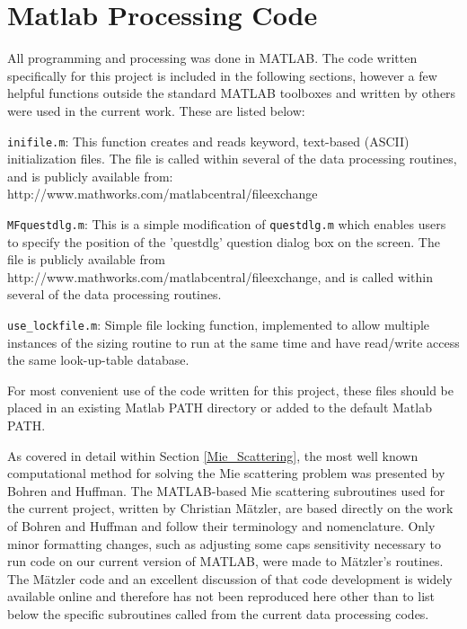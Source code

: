 \chapter{Matlab Processing Code}
\label{matlab_processing_code}


All programming and processing was done in MATLAB\cite{MATLAB}.  The code written specifically for this project is included in the following sections, however a few helpful functions outside the standard MATLAB toolboxes and written by others were used in the current work.   These are listed below:
\begin{compactitem}
 \item \texttt{inifile.m}: This function creates and reads keyword, text-based (ASCII) initialization files.  The file is called within several of the data processing routines, and is publicly available from:
 http://www.mathworks.com/matlabcentral/fileexchange
 \item \texttt{MFquestdlg.m}: This is a simple modification of \texttt{questdlg.m} which enables users to specify the position of the 'questdlg' question dialog box on the screen.  The file is publicly available from http://www.mathworks.com/matlabcentral/fileexchange, and is called within several of the data processing routines.
\item \texttt{use\_lockfile.m}: Simple file locking function, implemented to allow multiple instances of the sizing routine to run at the same time and have read/write access the same look-up-table database.
\end{compactitem}
\vspace*{0.25in}
For most convenient use of the code written for this project, these files should be placed in an existing Matlab PATH directory or added to the default Matlab PATH. 

As covered in detail within Section \ref{Mie_Scattering}, the most well known computational method for solving the Mie scattering problem was presented by Bohren and Huffman\cite{Bohren_Huffman}.  The MATLAB-based Mie scattering subroutines used for the current project, written by Christian M{\"a}tzler\cite{Matzler_matlab_mie}, are based directly on the work of Bohren and Huffman and follow their terminology and nomenclature.  Only minor formatting changes, such as adjusting some caps sensitivity necessary to run code on our current version of MATLAB, were made to M{\"a}tzler's routines.  The M{\"a}tzler code and an excellent discussion of that code development is widely available online and therefore has not been reproduced here other than to list below the specific subroutines called from the current data processing codes.

